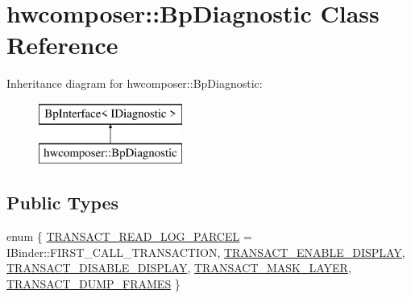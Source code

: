 \hypertarget{classhwcomposer_1_1BpDiagnostic}{}\section{hwcomposer\+:\+:Bp\+Diagnostic Class Reference}
\label{classhwcomposer_1_1BpDiagnostic}
Inheritance diagram for hwcomposer\+:\+:Bp\+Diagnostic\+:\begin{figure}[H]
\begin{center}
\leavevmode
\includegraphics[height=2.000000cm]{classhwcomposer_1_1BpDiagnostic}
\end{center}
\end{figure}
\subsection*{Public Types}
\begin{DoxyCompactItemize}
\item 
enum \{ \newline
\mbox{\hyperlink{classhwcomposer_1_1BpDiagnostic_a28475ea102b977cb7213262dc96a568da1c6934eb57e46477b1b76921ab9e1d8d}{T\+R\+A\+N\+S\+A\+C\+T\+\_\+\+R\+E\+A\+D\+\_\+\+L\+O\+G\+\_\+\+P\+A\+R\+C\+EL}} = I\+Binder\+:\+:F\+I\+R\+S\+T\+\_\+\+C\+A\+L\+L\+\_\+\+T\+R\+A\+N\+S\+A\+C\+T\+I\+ON, 
\mbox{\hyperlink{classhwcomposer_1_1BpDiagnostic_a28475ea102b977cb7213262dc96a568daccd4b7373af1f931dede971ad0e92972}{T\+R\+A\+N\+S\+A\+C\+T\+\_\+\+E\+N\+A\+B\+L\+E\+\_\+\+D\+I\+S\+P\+L\+AY}}, 
\mbox{\hyperlink{classhwcomposer_1_1BpDiagnostic_a28475ea102b977cb7213262dc96a568dae96b3abe1c20751a136bbe4309230923}{T\+R\+A\+N\+S\+A\+C\+T\+\_\+\+D\+I\+S\+A\+B\+L\+E\+\_\+\+D\+I\+S\+P\+L\+AY}}, 
\mbox{\hyperlink{classhwcomposer_1_1BpDiagnostic_a28475ea102b977cb7213262dc96a568daf904704142b648f549b6b220ee158711}{T\+R\+A\+N\+S\+A\+C\+T\+\_\+\+M\+A\+S\+K\+\_\+\+L\+A\+Y\+ER}}, 
\newline
\mbox{\hyperlink{classhwcomposer_1_1BpDiagnostic_a28475ea102b977cb7213262dc96a568dac8e288e1260c1218aa4f35e308cb3546}{T\+R\+A\+N\+S\+A\+C\+T\+\_\+\+D\+U\+M\+P\+\_\+\+F\+R\+A\+M\+ES}}
 \}
\end{DoxyCompactItemize}
